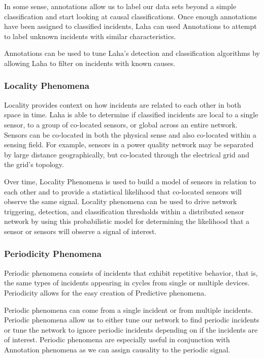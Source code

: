 In some sense, annotations allow us to label our data sets beyond a simple classification and start looking at causal classifications. Once enough annotations have been assigned to classified incidents, Laha can used Annotations to attempt to label unknown incidents with similar characteristics.

Annotations can be used to tune Laha's detection and classification algorithms by allowing Laha to filter on incidents with known causes.

\subsubsection{Locality Phenomena} \label{locality-phenomena}
Locality provides context on how incidents are related to each other in both space in time. Laha is able to determine if classified incidents are local to a single sensor, to a group of co-located sensors, or global across an entire network. Sensors can be co-located in both the physical sense and also co-located within a sensing field. For example, sensors in a power quality network may be separated by large distance geographically, but co-located through the electrical grid and the grid's topology. 

Over time, Locality Phenomena is used to build a model of sensors in relation to each other and to provide a statistical likelihood that co-located sensors will observe the same signal. Locality phenomena can be used to drive network triggering, detection, and classification thresholds within a distributed sensor network by using this probabilistic model for determining the likelihood that a sensor or sensors will observe a signal of interest.

\subsubsection{Periodicity Phenomena} \label{periodicity-phenomena}
Periodic phenomena consists of incidents that exhibit repetitive behavior, that is, the same types of incidents appearing in cycles from single or multiple devices. Periodicity allows for the easy creation of Predictive phenomena.

Periodic phenomena can come from a single incident or from multiple incidents. Periodic phenomena allow us to either tune our network to find periodic incidents or tune the  network to ignore periodic incidents depending on if the incidents are of interest. Periodic phenomena are especially useful in conjunction with Annotation phenomena as we can assign causality to the periodic signal. 

